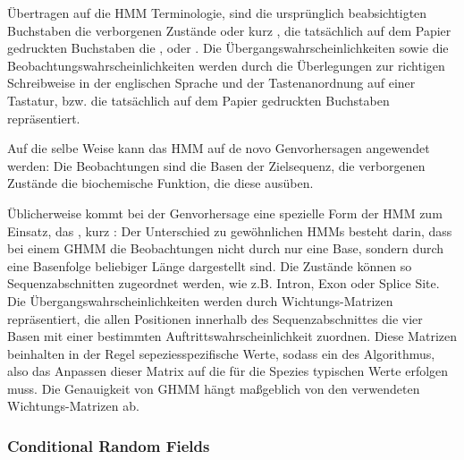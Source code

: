 Übertragen auf die HMM Terminologie, sind die ursprünglich beabsichtigten
Buchstaben die verborgenen Zustände oder kurz , die tatsächlich
auf dem Papier gedruckten Buchstaben die , oder
.
 Die Übergangswahrscheinlichkeiten sowie die Beobachtungswahrscheinlichkeiten
 werden durch die Überlegungen zur richtigen Schreibweise in der englischen
 Sprache und der Tastenanordnung auf einer Tastatur, bzw. die tatsächlich auf
 dem Papier gedruckten Buchstaben repräsentiert.

Auf die selbe Weise kann das HMM auf de novo  Genvorhersagen
angewendet werden:
Die Beobachtungen sind die Basen der Zielsequenz, die verborgenen Zustände die
biochemische Funktion, die diese ausüben.

Üblicherweise kommt bei der Genvorhersage eine spezielle Form der HMM zum
Einsatz, das , kurz :
Der Unterschied zu gewöhnlichen HMMs besteht darin, dass bei einem GHMM die
Beobachtungen nicht durch nur eine Base, sondern durch eine Basenfolge
beliebiger Länge dargestellt sind.
Die Zustände können so Sequenzabschnitten zugeordnet werden, wie z.B. Intron,
Exon oder Splice Site.
Die Übergangswahrscheinlichkeiten werden durch Wichtungs-Matrizen
repräsentiert, die allen Positionen innerhalb des Sequenzabschnittes die vier
Basen mit einer bestimmten Auftrittswahrscheinlichkeit zuordnen.
Diese Matrizen beinhalten in der Regel sepeziesspezifische Werte, sodass ein
 des Algorithmus, also das Anpassen dieser Matrix auf die für die
Spezies typischen Werte erfolgen muss.
Die Genauigkeit von GHMM hängt maßgeblich von den verwendeten
Wichtungs-Matrizen ab.
\citep{pmid16339376, pmid17687368, pmid10779491}

\subsubsection{Conditional Random Fields}